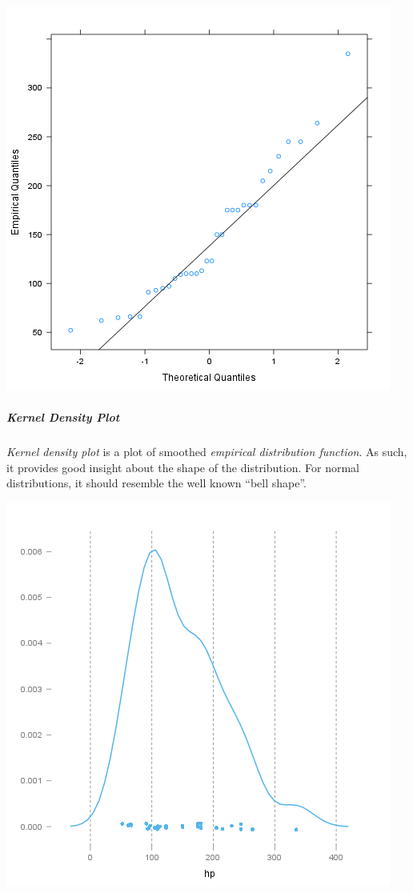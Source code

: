 \documentclass[]{article}
\makeatletter
\def\maxwidth{\ifdim\Gin@nat@width>\linewidth\linewidth
\else\Gin@nat@width\fi}
\let\Oldincludegraphics\includegraphics
\renewcommand{\includegraphics}[1]{\Oldincludegraphics[width=\maxwidth]{#1}}
\makeatother
\begin{document}
\href{1cefec04e4451a937a5c6aa4dfdcb352-hires.png}{\includegraphics{1cefec04e4451a937a5c6aa4dfdcb352.png}}

\subparagraph{Kernel Density Plot}

\emph{Kernel density plot} is a plot of smoothed \emph{empirical
distribution function}. As such, it provides good insight about the
shape of the distribution. For normal distributions, it should resemble
the well known ``bell shape''.

\href{edfab5d9e83f64514100b0acc016dbea-hires.png}{\includegraphics{edfab5d9e83f64514100b0acc016dbea.png}}
\end{document}
